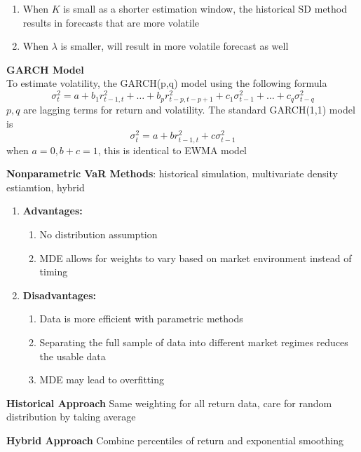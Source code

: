 \documentclass[11pt,fleqn]{report} %
\numberwithin{equation}{section} %
\numberwithin{figure}{section} %
\numberwithin{table}{section} %
\begin{document}
\begin{remark}
\begin{enumerate}
    \item When $K$ is small as a shorter estimation window, the historical SD method results in forecasts that are more volatile
    \item When $\lambda$ is smaller, will result in more volatile forecast as well
\end{enumerate}
\end{remark}
\begin{theorem}\textbf{GARCH Model}\\
To estimate volatility, the GARCH(p,q) model using the following formula
$$
\sigma_t^2=a+b_1r_{t-1,t}^2+\dots+b_{p}r_{t-p,t-p+1}^2+c_1\sigma_{t-1}^2+\dots+c_q\sigma_{t-q}^2
$$
$p,q$ are lagging terms for return and volatility. The standard GARCH(1,1) model is
$$
\sigma_t^2=a+br_{t-1,t}^2+c\sigma_{t-1}^2
$$
when $a=0,b+c=1$, this is identical to EWMA model
\end{theorem}
\begin{definition}\textbf{Nonparametric VaR Methods}: historical simulation, multivariate density estiamtion, hybrid
\begin{enumerate}
    \item \textbf{Advantages:}
    \begin{enumerate}
        \item No distribution assumption
        \item MDE allows for weights to vary based on market environment instead of timing
    \end{enumerate}
    \item \textbf{Disadvantages:}
    \begin{enumerate}
        \item Data is more efficient with parametric methods
        \item Separating the full sample of data into different market regimes reduces the usable data
        \item MDE may lead to overfitting
    \end{enumerate}
\end{enumerate}
\end{definition}
\begin{definition}\textbf{Historical Approach}
Same weighting for all return data, care for random distribution by taking average
\end{definition}
\begin{definition}\textbf{Hybrid Approach}
Combine percentiles of return and exponential smoothing
\end{definition}
\end{document}
